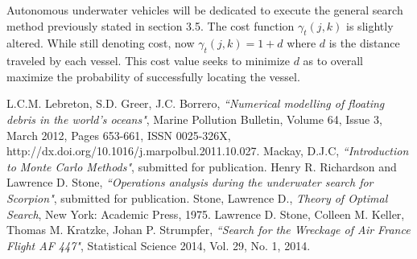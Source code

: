 \documentclass[a4paper]{article}
\begin{document}
Autonomous underwater vehicles will be dedicated to execute the general search method previously stated in section 3.5. The cost function $\gamma_t(j,k)$ is slightly altered. While still denoting cost, now $\gamma_t(j,k)=1+d$ where $d$ is the distance traveled by each vessel. This cost value seeks to minimize $d$ as to overall maximize the probability of successfully locating the vessel.



\pagebreak

\begin{thebibliography}{10}
 L.C.M. Lebreton, S.D. Greer, J.C. Borrero, \emph{``Numerical modelling of floating debris in the world’s oceans"}, Marine Pollution Bulletin, Volume 64, Issue 3, March 2012, Pages 653-661, ISSN 0025-326X, http://dx.doi.org/10.1016/j.marpolbul.2011.10.027.
 Mackay, D.J.C, \emph{``Introduction to Monte Carlo Methods"}, submitted for publication.
 Henry R. Richardson and Lawrence D. Stone, \emph{``Operations analysis during the underwater search for Scorpion"}, submitted for publication. 
 Stone, Lawrence D., \textit{Theory of Optimal Search}, New York: Academic Press, 1975.
 Lawrence D. Stone, Colleen M. Keller, Thomas M. Kratzke, Johan P. Strumpfer, \emph{``Search for the Wreckage of Air France Flight AF 447"}, Statistical Science 2014, Vol. 29, No. 1, 2014.
\end{thebibliography}
\end{document}
